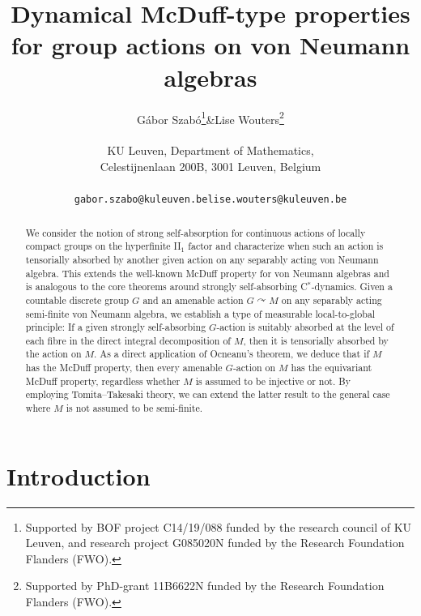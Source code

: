 \documentclass[11pt,a4paper]{article}
\title{Dynamical McDuff-type properties for group actions on von Neumann algebras}
\author{\begin{tabular}{ccc} Gábor Szabó\thanks{Supported by BOF project C14/19/088 funded by the research council of KU Leuven, and research project G085020N funded by the Research Foundation Flanders (FWO).} & \& & Lise Wouters\thanks{Supported by PhD-grant 11B6622N funded by the Research Foundation Flanders (FWO).} \end{tabular} \medskip\\
KU Leuven, Department of Mathematics, \\
Celestijnenlaan 200B, 3001 Leuven, Belgium \medskip\\ 
\begin{tabular}{ccc} \texttt{gabor.szabo@kuleuven.be} & & \texttt{lise.wouters@kuleuven.be} \end{tabular}}
\date{}
\theoremstyle{definition}
\theoremstyle{remark}
\numberwithin{equation}{section}
\numberwithin{theorem}{section}
\newcommand{\cstar}{C$^*$}
\begin{document}
\maketitle
\begin{abstract}
\noindent We consider the notion of strong self-absorption for continuous actions of locally compact groups on the hyperfinite II$_1$ factor and characterize when such an action is tensorially absorbed by another given action on any separably acting von Neumann algebra.
This extends the well-known McDuff property for von Neumann algebras and is analogous to the core theorems around strongly self-absorbing \cstar-dynamics.
Given a countable discrete group $G$ and an amenable action $G\curvearrowright M$ on any separably acting semi-finite von Neumann algebra, we establish a type of measurable local-to-global principle: If a given strongly self-absorbing $G$-action is suitably absorbed at the level of each fibre in the direct integral decomposition of $M$, then it is tensorially absorbed by the action on $M$.
As a direct application of Ocneanu's theorem, we deduce that if $M$ has the McDuff property, then every amenable $G$-action on $M$ has the equivariant McDuff property, regardless whether $M$ is assumed to be injective or not.
By employing Tomita--Takesaki theory, we can extend the latter result to the general case where $M$ is not assumed to be semi-finite.
\end{abstract}

\setcounter{tocdepth}{1}
\renewcommand{\baselinestretch}{0.5}\normalsize
\tableofcontents
\renewcommand{\baselinestretch}{1.00}\normalsize


\section*{Introduction}
\end{document}
